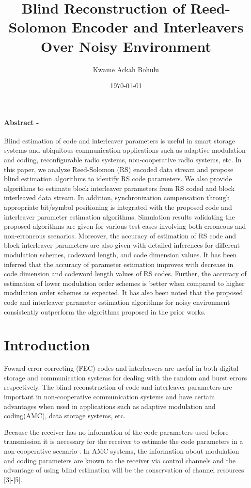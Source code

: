 \documentclass[fontsize=12pt]{article}
\title{Blind Reconstruction of Reed-Solomon Encoder
and Interleavers Over Noisy Environment}
\author{Kwame Ackah Bohulu}
\date{\today}
\begin{document}
\maketitle

\newpage
\paragraph{Abstract -}
Blind estimation of code and interleaver parameters
is useful in smart storage systems and ubiquitous communication
applications such as adaptive modulation and coding, reconfigurable
radio systems, non-cooperative radio systems, etc. In this
paper, we analyze Reed-Solomon (RS) encoded data stream and
propose blind estimation algorithms to identify RS code parameters.
We also provide algorithms to estimate block interleaver
parameters from RS coded and block interleaved data stream.
In addition, synchronization compensation through appropriate
bit/symbol positioning is integrated with the proposed code and
interleaver parameter estimation algorithms. Simulation results
validating the proposed algorithms are given for various test
cases involving both erroneous and non-erroneous scenarios.
Moreover, the accuracy of estimation of RS code and block
interleaver parameters are also given with detailed inferences
for different modulation schemes, codeword length, and code
dimension values. It has been inferred that the accuracy of
parameter estimation improves with decrease in code dimension
and codeword length values of RS codes. Further, the
accuracy of estimation of lower modulation order schemes is
better when compared to higher modulation order schemes as
expected. It has also been noted that the proposed code and
interleaver parameter estimation algorithms for noisy environment
consistently outperform the algorithms proposed in the
prior works.

\section{Introduction}
 
Foward error correcting (FEC) codes and interleavers are useful in both digital storage 
and communication systems for dealing with the random and burst errors respectively.
The blind reconstruction of code and interleaver parameters are important in 
non-cooperative communication systems and have certain advantages when used in 
applications such as adaptive modulation and coding(AMC), data storage systems, etc. 

Because 
the receiver has no information of the code parameters used before transmission it is
necessary for the receiver to estimate the code parameters in a non-cooperative scenario
. In AMC systems, the information about modulation and coding parameters are known 
to the receiver via control channels and the advantage of using blind estimation will be 
 the conservation of channel resources [3]-[5].
\end{document}
